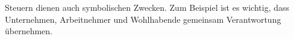 Steuern dienen auch symbolischen Zwecken.
Zum Beispiel ist es wichtig, dass Unternehmen, Arbeitnehmer und Wohlhabende gemeinsam Verantwortung übernehmen.